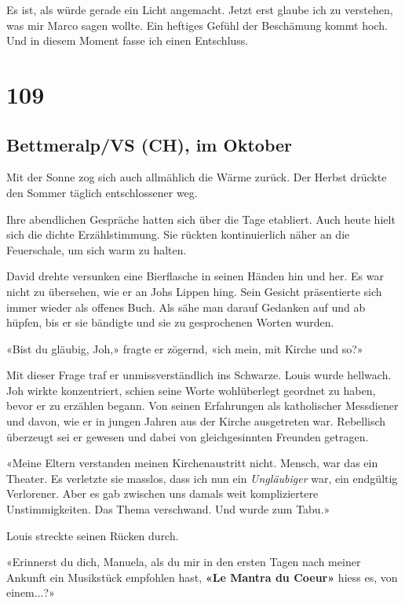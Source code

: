 Es ist, als würde gerade ein Licht angemacht. Jetzt erst glaube ich zu
verstehen, was mir Marco sagen wollte. Ein heftiges Gefühl der
Beschämung kommt hoch. Und in diesem Moment fasse ich einen Entschluss.

\chapter{109}\label{section-109}

\section{Bettmeralp/VS (CH), im
Oktober}\label{bettmeralpvs-ch-im-oktober-1}

Mit der Sonne zog sich auch allmählich die Wärme zurück. Der Herbst
drückte den Sommer täglich entschlossener weg.

Ihre abendlichen Gespräche hatten sich über die Tage etabliert. Auch
heute hielt sich die dichte Erzählstimmung. Sie rückten kontinuierlich
näher an die Feuerschale, um sich warm zu halten.

David drehte versunken eine Bierflasche in seinen Händen hin und her. Es
war nicht zu übersehen, wie er an Johs Lippen hing. Sein Gesicht
präsentierte sich immer wieder als offenes Buch. Als sähe man darauf
Gedanken auf und ab hüpfen, bis er sie bändigte und sie zu gesprochenen
Worten wurden.

«Bist du gläubig, Joh,» fragte er zögernd, «ich mein, mit Kirche und
so?»

Mit dieser Frage traf er unmissverständlich ins Schwarze. Louis wurde
hellwach. Joh wirkte konzentriert, schien seine Worte wohlüberlegt
geordnet zu haben, bevor er zu erzählen begann. Von seinen Erfahrungen
als katholischer Messdiener und davon, wie er in jungen Jahren aus der
Kirche ausgetreten war. Rebellisch überzeugt sei er gewesen und dabei
von gleichgesinnten Freunden getragen.

«Meine Eltern verstanden meinen Kirchenaustritt nicht. Mensch, war das
ein Theater. Es verletzte sie masslos, dass ich nun ein
\emph{Ungläubiger} war, ein endgültig Verlorener. Aber es gab zwischen
uns damals weit kompliziertere Unstimmigkeiten. Das Thema verschwand.
Und wurde zum Tabu.»

Louis streckte seinen Rücken durch.

«Erinnerst du dich, Manuela, als du mir in den ersten Tagen nach meiner
Ankunft ein Musikstück empfohlen hast, \textbf{«Le Mantra du Coeur»}
hiess es, von einem...?»

